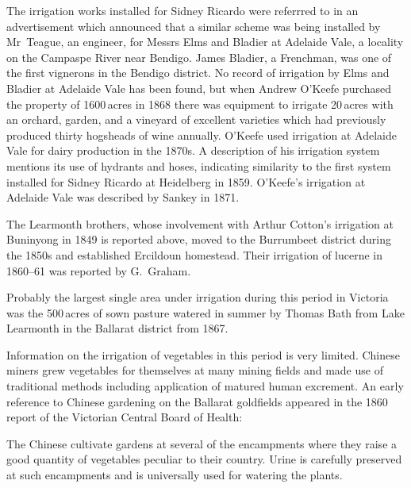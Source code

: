 The irrigation works installed for Sidney Ricardo were referrred to in
an advertisement which announced that a similar scheme was being
installed by Mr~Teague, an engineer, for Messrs Elms and Bladier at
Adelaide Vale, a locality on the Campaspe River 
near Bendigo.  James Bladier, 
a Frenchman, was one of the first vignerons  in the
Bendigo district.  No record of irrigation by Elms and Bladier at
Adelaide Vale  has been found, but when
Andrew O'Keefe  purchased the property of
1600\,acres in 1868 there was equipment to irrigate 20\,acres with an
orchard,  garden,  and a vineyard
 of excellent varieties which had previously produced
thirty hogsheads of wine annually.  O'Keefe used irrigation at
Adelaide Vale for dairy  production in the 1870s.  A
description of his irrigation system mentions its use of hydrants and
hoses, indicating similarity to the first system installed for Sidney
Ricardo at Heidelberg in 1859.  O'Keefe's irrigation at Adelaide Vale
was described by Sankey in 1871.

The Learmonth brothers,  whose involvement with
Arthur Cotton's irrigation at Buninyong in 1849 is reported above,
moved to the Burrumbeet  district during the
1850s and established Ercildoun 
homestead. Their irrigation of lucerne  in 1860--61 was
reported by G.~Graham.

Probably the largest single area under irrigation during this period
in Victoria was the 500\,acres of sown pasture watered
in summer by Thomas Bath  from Lake Learmonth
 in the Ballarat 
district from 1867.

Information on the irrigation of vegetables in this
period is very limited.  Chinese miners  grew
vegetables for themselves at many mining fields and made use of
traditional methods including application of matured human
excrement.  An early reference to Chinese
gardening on the Ballarat goldfields appeared in the
1860 report of the Victorian Central Board of Health:
\begin{Quote}
	The Chinese cultivate gardens at several of the encampments
	wh\-ere they raise a good quantity of vegetables peculiar to
	their country.  Urine is carefully preserved at such
	encampments and is universally used for watering the
	plants.
\end{Quote}

